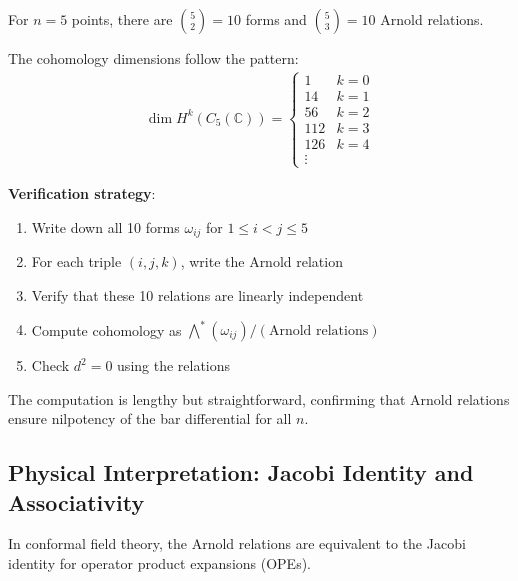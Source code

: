 \begin{example}[$n=5$: Complete Computation]
\label{ex:arnold-n5-complete}

For $n=5$ points, there are $\binom{5}{2} = 10$ forms and $\binom{5}{3} = 10$ Arnold 
relations.

The cohomology dimensions follow the pattern:
\begin{align}
\dim H^k(C_5(\mathbb{C})) = \begin{cases}
1 & k=0\\
14 & k=1\\
56 & k=2\\
112 & k=3\\
126 & k=4\\
\vdots
\end{cases}
\end{align}

\textbf{Verification strategy}:
\begin{enumerate}
\item Write down all 10 forms $\omega_{ij}$ for $1 \leq i < j \leq 5$
\item For each triple $(i,j,k)$, write the Arnold relation
\item Verify that these 10 relations are linearly independent
\item Compute cohomology as $\bigwedge^*(\omega_{ij}) / (\text{Arnold relations})$
\item Check $d^2 = 0$ using the relations
\end{enumerate}

The computation is lengthy but straightforward, confirming that Arnold relations ensure 
nilpotency of the bar differential for all $n$.
\end{example}

\subsection{Physical Interpretation: Jacobi Identity and Associativity}
\label{sec:arnold-physical}

\begin{theorem}[Arnold Relations = Jacobi Identity]
\label{thm:arnold-jacobi}
In conformal field theory, the Arnold relations are equivalent to the Jacobi identity 
for operator product expansions (OPEs).
\end{theorem}

